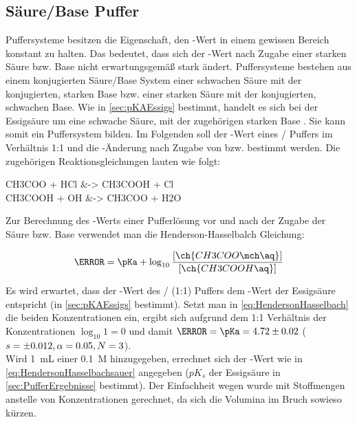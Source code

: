 \documentclass{article}
\begin{document}
    \pagebreak
    
    \subsection{Säure/Base Puffer} \label{sec:SauerBase}
    
      Puffersysteme besitzen die Eigenschaft, den \pH-Wert in einem gewissen Bereich konstant zu halten. Das bedeutet, dass sich der \pH-Wert nach Zugabe einer starken Säure bzw. Base nicht erwartungsgemäß stark ändert. Puffersysteme bestehen aus einem konjugierten Säure/Base System einer schwachen Säure mit der konjugierten, starken Base bzw. einer starken Säure mit der konjugierten, schwachen Base. Wie in \ref{sec:pKAEssigs} bestimmt, handelt es sich bei der Essigsäure um eine schwache Säure, mit der zugehörigen starken Base . Sie kann somit ein Puffersystem bilden. Im Folgenden soll der \pH-Wert eines / Puffers im Verhältnis 1:1 und die \pH-Änderung nach Zugabe von  bzw.  bestimmt werden. Die zugehörigen Reaktionsgleichungen lauten wie folgt:
      
      \begin{reactions}
        CH3COO\mch\aq{} + HCl\aq{} &-> CH3COOH\aq{} + Cl\mch\aq{} \label{rec:Protonenzugabe} \\
        CH3COOH\aq{} + OH\mch\aq{} &-> CH3COO\mch\aq{} + H2O 
      \end{reactions} 
      
      Zur Berechnung des \pH-Werts einer Pufferlösung vor und nach der Zugabe der Säure bzw. Base verwendet man die Henderson-Hasselbalch Gleichung:
      
      \begin{equation}
        \pH = \pKa + \log _{10} \frac{[\ch{CH3COO\mch\aq}]}{[\ch{CH3COOH\aq}]} \label{eq:HendersonHasselbach}
      \end{equation}
      
      Es wird erwartet, dass der \pH-Wert des / (1:1) Puffers dem \pKa-Wert der Essigsäure entspricht (in \ref{sec:pKAEssigs} bestimmt). Setzt man in \eqref{eq:HendersonHasselbach} die beiden Konzentrationen ein, ergibt sich aufgrund dem 1:1 Verhältnis der Konzentrationen $\log _{10} 1 = 0$ und damit $\pH = \pKa = \num[separate-uncertainty]{4.72 \pm 0.02}$ ($s = \num{\pm 0.012},\alpha = 0.05, N = 3$). \\
      
      Wird \SI[mode=text]{1}{\milli\liter} einer \SI[mode=text]{0.1}{M}  hinzugegeben, errechnet sich der \pH-Wert wie in \eqref{eq:HendersonHasselbachsauer} angegeben ($pK_{s}$ der Essigsäure in \ref{sec:PufferErgebnisse} bestimmt). Der Einfachheit wegen wurde mit Stoffmengen anstelle von Konzentrationen gerechnet, da sich die Volumina im Bruch sowieso kürzen.
      
\end{document}

